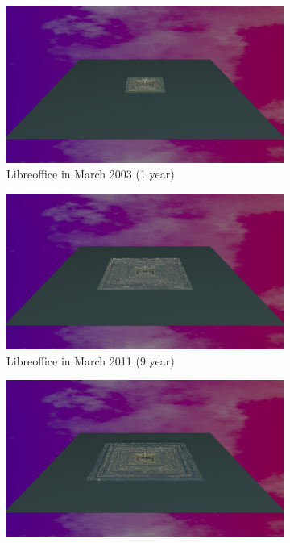 \begin{figure}[ht]
    \begin{subfigure}{0.48\textwidth}
        \includegraphics[width=\linewidth]{Libreoffice/Animation001.png}
        \caption{Libreoffice in March 2003 (1 year)} 
        \label{fig:Libre_V6_S1}
    \end{subfigure}\hspace*{\fill}
    \begin{subfigure}{0.48\textwidth}
        \includegraphics[width=\linewidth]{Libreoffice/Animation009.png}
        \caption{Libreoffice in March 2011 (9 year)} 
        \label{fig:Libre_V6_S2}
    \end{subfigure}
    \medskip
    \begin{subfigure}{0.48\textwidth}
        \includegraphics[width=\linewidth]{Libreoffice/Animation010.png}

\end{subfigure}
\end{figure}
